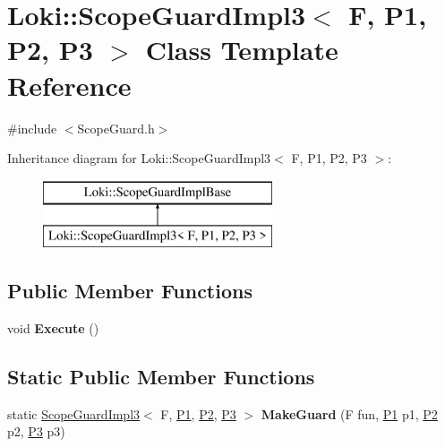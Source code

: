 \hypertarget{classLoki_1_1ScopeGuardImpl3}{}\section{Loki\+:\+:Scope\+Guard\+Impl3$<$ F, P1, P2, P3 $>$ Class Template Reference}
\label{classLoki_1_1ScopeGuardImpl3}


{\ttfamily \#include $<$Scope\+Guard.\+h$>$}

Inheritance diagram for Loki\+:\+:Scope\+Guard\+Impl3$<$ F, P1, P2, P3 $>$\+:\begin{figure}[H]
\begin{center}
\leavevmode
\includegraphics[height=2.000000cm]{classLoki_1_1ScopeGuardImpl3}
\end{center}
\end{figure}
\subsection*{Public Member Functions}
\begin{DoxyCompactItemize}
\item 
\hypertarget{classLoki_1_1ScopeGuardImpl3_a1e424126a10ba703ea73a23c9d7d7c66}{}void {\bfseries Execute} ()\label{classLoki_1_1ScopeGuardImpl3_a1e424126a10ba703ea73a23c9d7d7c66}

\end{DoxyCompactItemize}
\subsection*{Static Public Member Functions}
\begin{DoxyCompactItemize}
\item 
\hypertarget{classLoki_1_1ScopeGuardImpl3_a9801015f6565b34234fa354295d84099}{}static \hyperlink{classLoki_1_1ScopeGuardImpl3}{Scope\+Guard\+Impl3}$<$ F, \hyperlink{structP1}{P1}, \hyperlink{structP2}{P2}, \hyperlink{structP3}{P3} $>$ {\bfseries Make\+Guard} (F fun, \hyperlink{structP1}{P1} p1, \hyperlink{structP2}{P2} p2, \hyperlink{structP3}{P3} p3)\label{classLoki_1_1ScopeGuardImpl3_a9801015f6565b34234fa354295d84099}

\end{DoxyCompactItemize}
